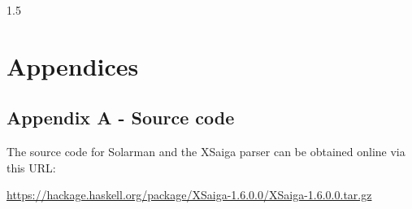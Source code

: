 \documentclass[fleqn, oneside, 12pt]{book}
\theoremstyle{definitionsty}
\newcommand{\uwinonehalfspacelen}{1.5}
\newcommand{\uwindefaultspacelen}{\uwinonehalfspacelen}
\newenvironment{uwindefaultspaceenv}%
{\begin{spacing}{\uwindefaultspacelen}}%
	{\end{spacing}}
\begin{document}
\clearpage
{}
{}
\tableofcontents


\begin{uwindefaultspaceenv}

\clearpage
{}
{}
\listoffigures

\clearpage
{}
{}
\listofappendices

\clearpage
{}
{}
\listoftheorems[ignoreall,show={definition}]


\clearpage
{}

\renewcommand{\refname}{Bibliography}


%
%
%
%
%
%
%
%



\chapter*{Appendices}

\section*{Appendix A - Source code}

The source code for Solarman and the XSaiga parser can be obtained online via this URL:

{\noindent \small \url{https://hackage.haskell.org/package/XSaiga-1.6.0.0/XSaiga-1.6.0.0.tar.gz}}


\end{uwindefaultspaceenv}
\end{document}
